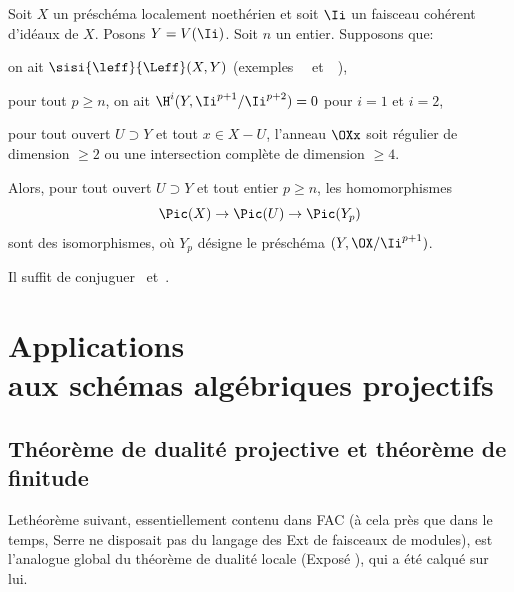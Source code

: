 \begin{theoreme} \label{XI.3.18}
Soit $X$ un pr\'esch\'ema localement noeth\'erien et soit $\Ii$ un faisceau coh\'erent d'id\'eaux de $X$. Posons $Y=V(\Ii)$. Soit $n$ un entier. Supposons que:
\begin{enumeratei}
\item
on ait $\sisi{\leff}{\Leff}(X, Y)$ (\cf exemples ~~et~~),
\item
pour tout $p\geq n$, on ait $\H^i(Y, \Ii^{p+1}/\Ii^{p+2})=0$ pour $i=1$ et $i=2$,
\item
pour tout ouvert $U\supset Y$ et tout $x\in X-U$, l'anneau $\OXx$ soit r\'egulier de dimension $\geq 2$ ou une intersection compl\`ete de dimension $\geq 4$.
\end{enumeratei}
\noindent
Alors, pour tout ouvert $U\supset Y$ et tout entier $p\geq n$, les homomorphismes
\[
\Pic(X)\to\Pic(U)\to\Pic(Y_p)
\]
sont des isomorphismes, o\`u $Y_p$ d\'esigne le pr\'esch\'ema $(Y, \OX/\Ii^{p+1})$.
\end{theoreme}

Il suffit de conjuguer ~et~.

\chapter[Applications aux sch\'emas alg\'ebriques projectifs]
{Applications\\ aux sch\'emas alg\'ebriques projectifs} \label{XII}

\renewcommand{\theequation}{\arabic{equation}}

\section[Th\'eor\`eme de dualit\'e projective et th\'eor\`eme de finitude]
{Th\'eor\`eme de dualit\'e projective et th\'eor\`eme de finitude\protect\sfootnotemark}\label{XII.1}

Le\pageoriginale th\'eor\`eme suivant, essentiellement contenu dans FAC (\`a cela pr\`es que dans le temps, Serre ne disposait pas du langage des Ext de faisceaux de modules), est l'analogue global du th\'eor\`eme de dualit\'e locale (Expos\'e ), qui a \'et\'e calqu\'e sur lui.

